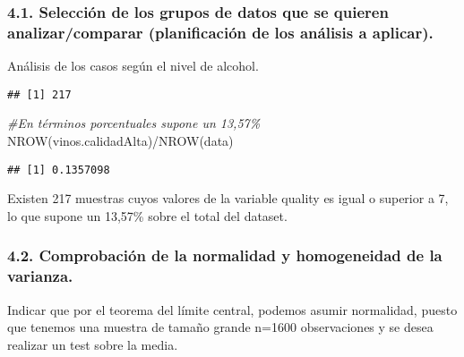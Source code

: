 \documentclass[
]{article}
\newenvironment{Shaded}{\begin{snugshade}}{\end{snugshade}}
\newcommand{\CommentTok}[1]{\textcolor[rgb]{0.56,0.35,0.01}{\textit{#1}}}
\newcommand{\DecValTok}[1]{\textcolor[rgb]{0.00,0.00,0.81}{#1}}
\newcommand{\FunctionTok}[1]{\textcolor[rgb]{0.00,0.00,0.00}{#1}}
\newcommand{\NormalTok}[1]{#1}
\newcommand{\OtherTok}[1]{\textcolor[rgb]{0.56,0.35,0.01}{#1}}
\newcommand{\SpecialCharTok}[1]{\textcolor[rgb]{0.00,0.00,0.00}{#1}}
\begin{document}
\hypertarget{selecciuxf3n-de-los-grupos-de-datos-que-se-quieren-analizarcomparar-planificaciuxf3n-de-los-anuxe1lisis-a-aplicar.}{%
\subsubsection{4.1. Selección de los grupos de datos que se quieren
analizar/comparar (planificación de los análisis a
aplicar).}\label{selecciuxf3n-de-los-grupos-de-datos-que-se-quieren-analizarcomparar-planificaciuxf3n-de-los-anuxe1lisis-a-aplicar.}}

Análisis de los casos según el nivel de alcohol.

\begin{Shaded}
\end{Shaded}

\begin{verbatim}
## [1] 217
\end{verbatim}

\begin{Shaded}
\begin{Highlighting}[]
\CommentTok{\#En términos porcentuales supone un 13,57\%}
\FunctionTok{NROW}\NormalTok{(vinos.calidadAlta)}\SpecialCharTok{/}\FunctionTok{NROW}\NormalTok{(data)}
\end{Highlighting}
\end{Shaded}

\begin{verbatim}
## [1] 0.1357098
\end{verbatim}

Existen 217 muestras cuyos valores de la variable quality es igual o
superior a 7, lo que supone un 13,57\% sobre el total del dataset.

\hypertarget{comprobaciuxf3n-de-la-normalidad-y-homogeneidad-de-la-varianza.}{%
\subsubsection{4.2. Comprobación de la normalidad y homogeneidad de la
varianza.}\label{comprobaciuxf3n-de-la-normalidad-y-homogeneidad-de-la-varianza.}}

Indicar que por el teorema del límite central, podemos asumir
normalidad, puesto que tenemos una muestra de tamaño grande n=1600
observaciones y se desea realizar un test sobre la media.
\end{document}
